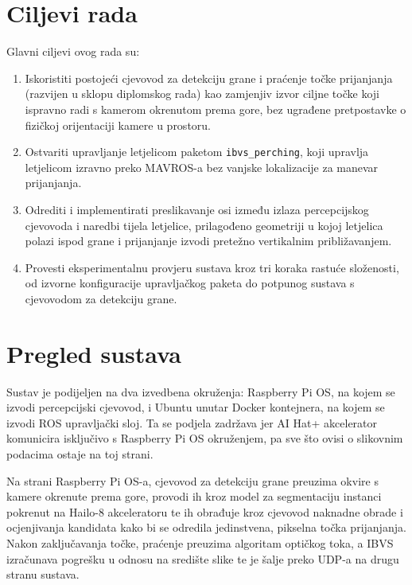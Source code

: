 \section{Ciljevi rada}
\label{sec:ciljevi}

Glavni ciljevi ovog rada su:

\begin{enumerate}
  \item Iskoristiti postojeći cjevovod za detekciju grane i praćenje točke prijanjanja (razvijen u sklopu diplomskog rada) kao zamjenjiv izvor ciljne točke koji ispravno radi s kamerom okrenutom prema gore, bez ugrađene pretpostavke o fizičkoj orijentaciji kamere u prostoru.
  \item Ostvariti upravljanje letjelicom paketom \texttt{ibvs\_perching}, koji upravlja letjelicom izravno preko MAVROS-a bez vanjske lokalizacije za manevar prijanjanja.
  \item Odrediti i implementirati preslikavanje osi između izlaza percepcijskog cjevovoda i naredbi tijela letjelice, prilagođeno geometriji u kojoj letjelica polazi ispod grane i prijanjanje izvodi pretežno vertikalnim približavanjem.
  \item Provesti eksperimentalnu provjeru sustava kroz tri koraka rastuće složenosti, od izvorne konfiguracije upravljačkog paketa do potpunog sustava s cjevovodom za detekciju grane.
\end{enumerate}

\section{Pregled sustava}
\label{sec:pregled-sustava}

Sustav je podijeljen na dva izvedbena okruženja: Raspberry Pi OS, na kojem se izvodi percepcijski cjevovod, i Ubuntu unutar Docker kontejnera, na kojem se izvodi ROS upravljački sloj. Ta se podjela zadržava jer AI Hat+ akcelerator komunicira isključivo s Raspberry Pi OS okruženjem, pa sve što ovisi o slikovnim podacima ostaje na toj strani.

Na strani Raspberry Pi OS-a, cjevovod za detekciju grane preuzima okvire s kamere okrenute prema gore, provodi ih kroz model za segmentaciju instanci pokrenut na Hailo-8 akceleratoru te ih obrađuje kroz cjevovod naknadne obrade i ocjenjivanja kandidata kako bi se odredila jedinstvena, pikselna točka prijanjanja. Nakon zaključavanja točke, praćenje preuzima algoritam optičkog toka, a IBVS izračunava pogrešku u odnosu na središte slike te je šalje preko UDP-a na drugu stranu sustava.

